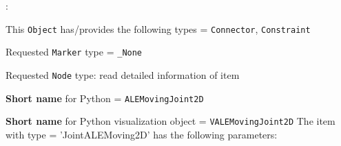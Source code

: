 \noindent {}:
\bi
  \item This \texttt{Object} has/provides the following types = \texttt{Connector}, \texttt{Constraint}
  \item Requested \texttt{Marker} type = \texttt{\_None}
  \item Requested \texttt{Node} type: read detailed information of item
  \item {\bf Short name} for Python = \texttt{ALEMovingJoint2D}
  \item {\bf Short name} for Python visualization object = \texttt{VALEMovingJoint2D}
\ei\vspace{12pt} \noindent 
The item  with type = 'JointALEMoving2D' has the following parameters:
\vspace{-0.5cm}\\
\vspace{-0.5cm}\\
